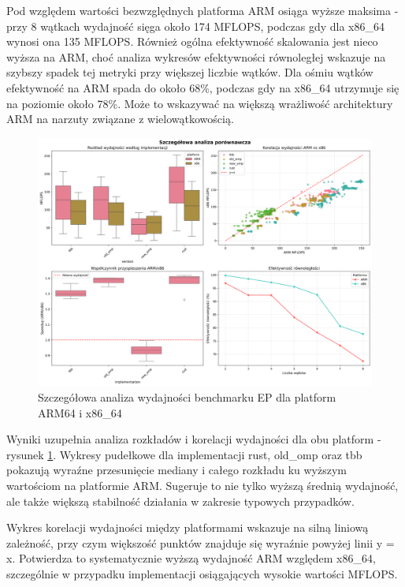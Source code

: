 Pod względem wartości bezwzględnych platforma ARM osiąga wyższe maksima - przy 8 wątkach wydajność sięga około 174 MFLOPS, podczas gdy dla x86\_64 wynosi ona 135 MFLOPS. Również ogólna efektywność skalowania jest nieco wyższa na ARM, choć analiza wykresów efektywności równoległej wskazuje na szybszy spadek tej metryki przy większej liczbie wątków. Dla ośmiu wątków efektywność na ARM spada do około 68\%, podczas gdy na x86\_64 utrzymuje się na poziomie około 78\%. Może to wskazywać na większą wrażliwość architektury ARM na narzuty związane z wielowątkowością.
\begin{figure}[H]
    \centering
    \includegraphics[width=\textwidth]{analiza/images/parallel/ep/compare/ep_szczegolowa_analiza_wydajnosci.png}
    \caption{Szczegółowa analiza wydajności benchmarku EP dla platform ARM64 i x86\_64}
    \label{ep_szczegolowa_analiza_wydajnosci}
\end{figure}

Wyniki uzupełnia analiza rozkładów i korelacji wydajności dla obu platform - rysunek \ref{ep_szczegolowa_analiza_wydajnosci}. Wykresy pudełkowe dla implementacji rust, old\_omp oraz tbb pokazują wyraźne przesunięcie mediany i całego rozkładu ku wyższym wartościom na platformie ARM. Sugeruje to nie tylko wyższą średnią wydajność, ale także większą stabilność działania w zakresie typowych przypadków.

Wykres korelacji wydajności między platformami wskazuje na silną liniową zależność, przy czym większość punktów znajduje się wyraźnie powyżej linii y = x. Potwierdza to systematycznie wyższą wydajność ARM względem x86\_64, szczególnie w przypadku implementacji osiągających wysokie wartości MFLOPS.

